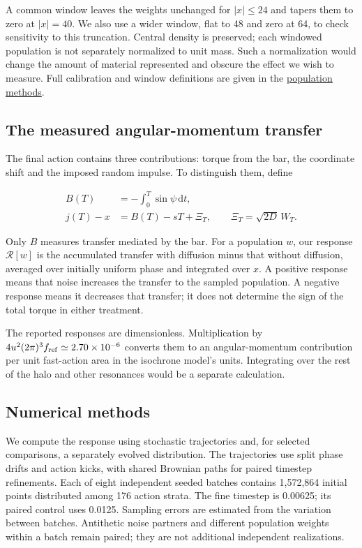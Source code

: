 \documentclass[fleqn,usenatbib]{mnras}
\begin{document}
A common window leaves the weights unchanged for \(|x|\leq24\) and tapers them to zero at \(|x|=40\). We also use a wider window, flat to 48 and zero at 64, to check sensitivity to this truncation. Central density is preserved; each windowed population is not separately normalized to unit mass. Such a normalization would change the amount of material represented and obscure the effect we wish to measure. Full calibration and window definitions are given in the \href{https://djova.ca/galaxy-bar/population-methods.html}{population methods}.

\subsection{The measured angular-momentum transfer}\label{the-measured-angular-momentum-transfer}

The final action contains three contributions: torque from the bar, the coordinate shift and the imposed random impulse. To distinguish them, define

\begin{equation}\label{EQ-OBS-01}
\begin{aligned}
B(T)&=-\int_0^T\sin\psi\,\mathrm dt,\\
j(T)-x&=B(T)-sT+\Xi_T,\qquad
\Xi_T=\sqrt{2D}\,W_T.
\end{aligned}
\end{equation}

Only \(B\) measures transfer mediated by the bar. For a population \(w\), our response \(\mathcal R[w]\) is the accumulated transfer with diffusion minus that without diffusion, averaged over initially uniform phase and integrated over \(x\). A positive response means that noise increases the transfer to the sampled population. A negative response means it decreases that transfer; it does not determine the sign of the total torque in either treatment.

The reported responses are dimensionless. Multiplication by \(4u^2(2\pi)^3f_{\rm ref}\simeq2.70\times10^{-6}\) converts them to an angular-momentum contribution per unit fast-action area in the isochrone model's units. Integrating over the rest of the halo and other resonances would be a separate calculation.

\subsection{Numerical methods}\label{numerical-methods}

We compute the response using stochastic trajectories and, for selected comparisons, a separately evolved distribution. The trajectories use split phase drifts and action kicks, with shared Brownian paths for paired timestep refinements. Each of eight independent seeded batches contains 1,572,864 initial points distributed among 176 action strata. The fine timestep is 0.00625; its paired control uses 0.0125. Sampling errors are estimated from the variation between batches. Antithetic noise partners and different population weights within a batch remain paired; they are not additional independent realizations.
\end{document}
